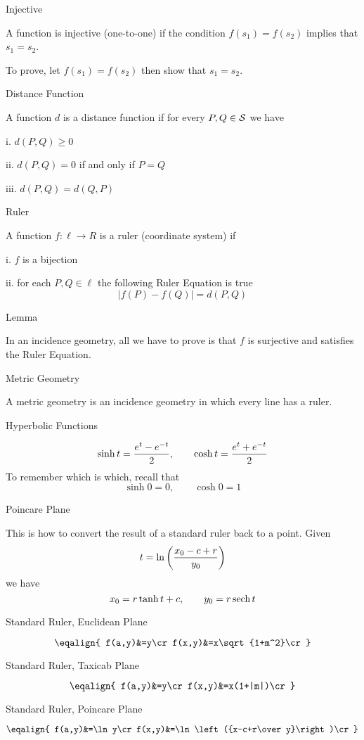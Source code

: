  Injective

A function is injective (one-to-one) if the condition $f(s_1)=f(s_2)$ implies that $s_1=s_2$.

\medskip\noindent
To prove, let $f(s_1)=f(s_2)$ then show that $s_1=s_2$.

 Distance Function

A function $d$ is a distance function if for every $P,Q\in\cal S$ we have
\item{i.} $d(P,Q)\ge 0$
\item{ii.} $d(P,Q)=0$ if and only if $P=Q$
\item{iii.} $d(P,Q)=d(Q,P)$

 Ruler

A function $f:\ell\rightarrow R$ is a ruler (coordinate system) if
\item{i.} $f$ is a bijection
\item{ii.} for each $P,Q\in\ell$ the following Ruler Equation is true
$$|f(P)-f(Q)|=d(P,Q)$$

 Lemma

In an incidence geometry, all we have to prove is that $f$ is surjective and
satisfies the Ruler Equation.

 Metric Geometry

A metric geometry is an incidence geometry in which every line has a ruler.

 Hyperbolic Functions

$$\sinh t={e^t-e^{-t}\over2},\qquad \cosh t={e^t+e^{-t}\over2}$$
To remember which is which, recall that
$$\sinh0=0,\qquad\cosh0=1$$

 Poincare Plane

This is how to convert the result of a standard ruler back to a point. Given
$$t=\ln\left({x_0-c+r\over y_0}\right)$$
we have
$$x_0=r\tanh t+c,\qquad y_0=r\mathop{\hbox{sech}}t$$

 Standard Ruler, Euclidean Plane

$$\eqalign{
f(a,y)&=y\cr
f(x,y)&=x\sqrt{1+m^2}\cr
}$$

 Standard Ruler, Taxicab Plane

$$\eqalign{
f(a,y)&=y\cr
f(x,y)&=x(1+|m|)\cr
}$$

 Standard Ruler, Poincare Plane

$$\eqalign{
f(a,y)&=\ln y\cr
f(x,y)&=\ln\left({x-c+r\over y}\right)\cr
}$$

